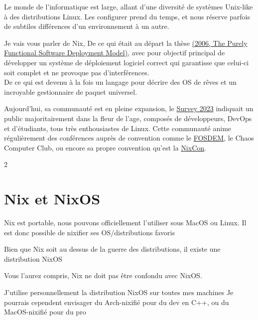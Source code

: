 \documentclass[a4paper,11pt]{article}
\title{
  \blogtitle{De ArchLinux à Nix/NixOS}
}
\author{}
\date{}
\begin{document}

\maketitle

\thispagestyle{first}
\begin{blogmain}
Le monde de l'informatique est large, allant d'une diversité de systèmes Unix-like à des distributions Linux.
Les configurer prend du temps, et nous réserve parfois de subtiles différences d'un environnement à un autre.

Je vais vous parler de Nix, 
De ce qui était au départ la thèse \href{https://edolstra.github.io/pubs/phd-thesis.pdf}{(2006, The Purely Functional Software Deployment Model)}, avec pour objectif principal de développer un système de déploiement logiciel correct qui garantisse que celui-ci soit complet et ne provoque pas d'interférences. \\
De ce qui est devenu à la fois un langage pour décrire des OS de rêves et un incroyable gestionnaire de paquet universel.

Aujourd'hui, sa communauté est en pleine expansion, le \href{https://discourse.nixos.org/t/nix-community-survey-2023-results/33124/26}{Survey 2023} indiquait un public majoritairement dans la fleur de l'age, composés de développeurs, DevOps et d'étudiants, tous très enthousiastes de Linux. Cette communauté anime régulièrement des conférences auprès de convention comme le \href{https://fosdem.org}{FOSDEM}, le Chaos Computer Club, ou encore sa propre convention qu'est la \href{https://2024.nixcon.org}{NixCon}.

\begin{multicols}{2}
\section{Nix et NixOS}
Nix est portable, nous pouvons officiellement l'utiliser sous MacOS ou Linux.
Il est donc possible de nixifier ses OS/distributions favoris

Bien que Nix soit au dessus de la guerre des distributions, il existe une distribution NixOS

Vous l'aurez compris, Nix ne doit pas être confondu avec NixOS.

J'utilise personnellement la distribution NixOS sur toutes mes machines
Je pourrais cependent envisager du Arch-nixifié pour du dev en C++, ou du MacOS-nixifié pour du pro


\end{multicols}
\end{blogmain}
\end{document}
